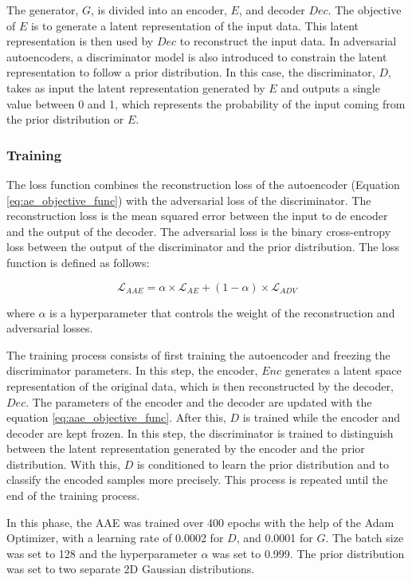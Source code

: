 The generator, $G$, is divided into an encoder, $E$, and decoder $Dec$. The objective of $E$ is to generate a latent representation of the input data. This latent representation is then used by $Dec$ to reconstruct the input data. In adversarial autoencoders, a discriminator model is also introduced to constrain the latent representation to follow a prior distribution. In this case, the discriminator, $D$, takes as input the latent representation generated by $E$ and outputs a single value between 0 and 1, which represents the probability of the input coming from the prior distribution or $E$.

\subsubsection*{Training}

The loss function combines the reconstruction loss of the autoencoder (Equation \ref{eq:ae_objective_func}) with the adversarial loss of the discriminator. The reconstruction loss is the mean squared error between the input to de encoder and the output of the decoder. The adversarial loss is the binary cross-entropy loss between the output of the discriminator and the prior distribution. The loss function is defined as follows:

\begin{equation}\label{eq:aae_objective_func}
    \mathcal{L}_{AAE} = \alpha \times \mathcal{L}_{AE} + (1-\alpha) \times \mathcal{L}_{ADV}
\end{equation}

where $\alpha$ is a hyperparameter that controls the weight of the reconstruction and adversarial losses.

The training process consists of first training the autoencoder and freezing the discriminator parameters. In this step, the encoder, $Enc$ generates a latent space representation of the original data, which is then reconstructed by the decoder, $Dec$. The parameters of the encoder and the decoder are updated with the equation \ref{eq:aae_objective_func}. After this, $D$ is trained while the encoder and decoder are kept frozen. In this step, the discriminator is trained to distinguish between the latent representation generated by the encoder and the prior distribution. With this, $D$ is conditioned to learn the prior distribution and to classify the encoded samples more precisely. This process is repeated until the end of the training process.

In this phase, the AAE was trained over 400 epochs with the help of the Adam Optimizer, with a learning rate of 0.0002 for $D$, and 0.0001 for $G$. The batch size was set to 128 and the hyperparameter $\alpha$ was set to 0.999. The prior distribution was set to two separate 2D Gaussian distributions. 


